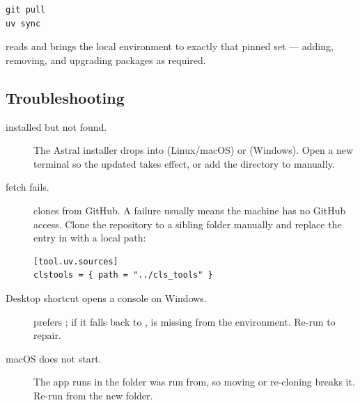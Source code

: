 \begin{lstlisting}
git pull
uv sync
\end{lstlisting}

 reads  and brings the local environment
to exactly that pinned set --- adding, removing, and upgrading
packages as required.

\subsection{Troubleshooting}

\begin{description}
    \item[ installed but not found.]
        The Astral installer drops  into
         (Linux/macOS) or
        (Windows). Open a new terminal so the updated 
        takes effect, or add the directory to  manually.
    \item[ fetch fails.]
         clones  from GitHub. A
        failure usually means the machine has no GitHub access. Clone
        the repository to a sibling folder manually and replace the
        entry in  with a local path:
\begin{lstlisting}
[tool.uv.sources]
clstools = { path = "../cls_tools" }
\end{lstlisting}
    \item[Desktop shortcut opens a console on Windows.]
         prefers
        ;
        if it falls back to ,  is
        missing from the environment. Re-run  to repair.
    \item[macOS  does not start.]
        The app runs  in the folder
         was run from, so moving or re-cloning
        \denis{} breaks it. Re-run  from
        the new folder.
\end{description}
